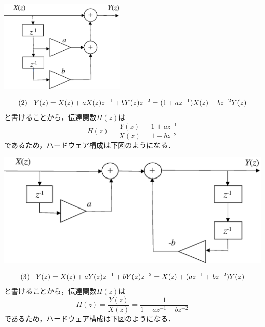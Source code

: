 \begin{center}
\includegraphics[width=6cm]{fig/zu-9e-1a.eps}
\end{center}

\begin{displaymath}
(2) \hspace{3mm} Y(z)=X(z)+aX(z)z^{-1}+bY(z)z^{-2}=(1+az^{-1})X(z)+bz^{-2}Y(z) \nonumber 
\end{displaymath}
と書けることから，伝達関数$H(z)$は
\begin{displaymath}
H(z)=\frac{Y(z)}{X(z)}=\frac{1+az^{-1}}{1-bz^{-2}} \nonumber
\end{displaymath}
であるため，ハードウェア構成は下図のようになる．

\begin{center}
\includegraphics[width=.6\textwidth]{fig/zu-9e-1b.eps}
\end{center}

\begin{displaymath}
(3) \hspace{3mm} Y(z)=X(z)+aY(z)z^{-1}+bY(z)z^{-2}=X(z)+(az^{-1}+bz^{-2})Y(z) \nonumber
\end{displaymath}
と書けることから，伝達関数$H(z)$は
\begin{displaymath}
H(z)=\frac{Y(z)}{X(z)}=\frac{1}{1-az^{-1}-bz^{-2}} \nonumber
\end{displaymath}
であるため，ハードウェア構成は下図のようになる．

